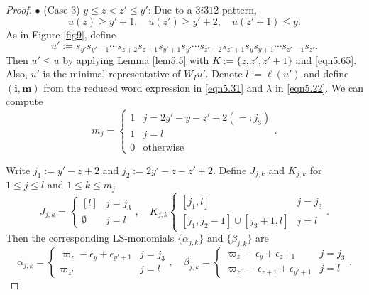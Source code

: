 \documentclass[12pt]{amsart}
\theoremstyle{definition}
\theoremstyle{remark}
\begin{document}
\begin{proof}
$\bullet$ (Case 3) $y \leq z<z' \leq y'$: Due to a $3i312$ pattern,
\begin{equation}\label{eqn5.65}
u(z) \geq y'+1, \quad u(z') \geq y'+2, \quad u(z'+1) \leq y.
\end{equation}
As in Figure \ref{fig9}, define
\begin{equation}\label{eqn5.31}
u':= s_{y'} s_{y'-1} \cdots s_{z+2}s_{z+1} s_{y'+1} s_{y'} \cdots s_{z'+2}s_{z'+1} s_y s_{y+1} \cdots s_{z'-1}s_{z'}.
\end{equation}
Then $u' \leq u$ by applying Lemma \ref{lem5.5} with $K:=\{ z , z' , z'+1 \}$ and \eqref{eqn5.65}. Also, $u'$ is the minimal representative of $W_Iu'$. Denote $l:= \ell (u')$ and define $(\mathbf{i}, \mathbf{m})$ from the reduced word expression in \eqref{eqn5.31} and $\lambda$ in \eqref{eqn5.22}. We can compute
\begin{equation}\label{eqn5.32}
m_j = 
\begin{cases}
1 & j = 2y'-y-z'+2(=:j_3) \\
1 & j = l \\
0 & \text{otherwise}
\end{cases}
.
\end{equation}

Write $j_1:= y'-z+2$ and $j_2:= 2y' - z - z' +2$. Define $J_{j,k}$ and $K_{j,k}$ for $1\leq j \leq l$ and $1 \leq k \leq m_j$
\begin{equation}\label{eqn5.33}
J_{j,k} = 
\begin{cases}
[l] & j=j_3 \\
\emptyset & j = l
\end{cases}
, \quad K_{j,k}
\begin{cases}
[j_1,l] & j =j_3 \\
[j_1, j_2-1] \cup [j_3+1,l]& j =l
\end{cases}
.
\end{equation}
Then the corresponding LS-monomials $\{\alpha_{j,k}\}$ and $\{\beta_{j,k}\}$ are
\begin{equation}\label{eqn5.34}
\alpha_{j,k} = 
\begin{cases}
\varpi_{z}-\epsilon_y+\epsilon_{y'+1} & j = j_3 \\
\varpi_{z'} & j=l 
\end{cases}
, \quad \beta_{j,k}=
\begin{cases}
\varpi_{z}-\epsilon_{y} + \epsilon_{z+1} & j = j_3 \\
\varpi_{z'}-\epsilon_{z+1} + \epsilon_{y'+1} & j=l 
\end{cases}
.
\end{equation}


\end{proof}
\end{document}
